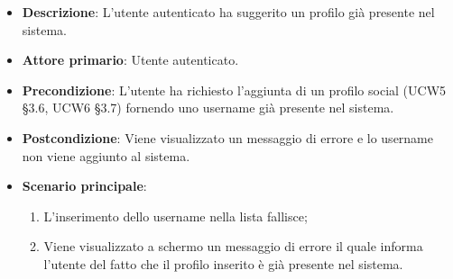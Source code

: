 \begin{itemize}
	\item \textbf{Descrizione}: L'utente autenticato ha suggerito un profilo già presente nel sistema.
    \item \textbf{Attore primario}: Utente autenticato.
    \item \textbf{Precondizione}: L’utente ha richiesto l’aggiunta di un profilo social (UCW5 §3.6, UCW6 §3.7) fornendo uno username già presente nel sistema.
    \item \textbf{Postcondizione}: Viene visualizzato un messaggio di errore e lo username non viene aggiunto al sistema.
    \item \textbf{Scenario principale}: 
    \begin{enumerate}
        \item L'inserimento dello username nella lista fallisce;
        \item Viene visualizzato a schermo un messaggio di errore il quale informa l'utente del fatto che il profilo inserito è già presente nel sistema.
    \end{enumerate}
\end{itemize}

